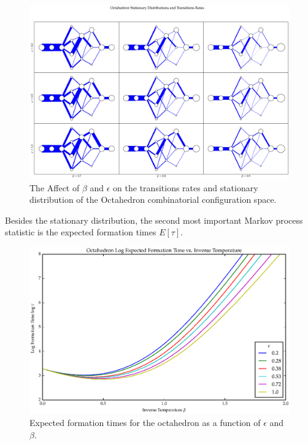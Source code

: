 \begin{figure}[ht]
\label{fig:OctaPiGrid}
\centering
  \includegraphics[scale=0.22]{images/octahedron_pi_Q_grid.eps}
\caption{The Affect of $\beta$ and $\epsilon$ on the transitions rates and stationary distribution of the Octahedron combinatorial configuration space.}
\end{figure}

Besides the stationary distribution, the second most important Markov process statistic is the expected formation times $E[\tau]$.
\begin{figure}[ht]
\label{fig:OctaTau}
\centering
  \includegraphics[scale=0.6]{images/octahedron_tau.eps}
\caption{Expected formation times for the octahedron as a function of $\epsilon$ and $\beta$.}
\end{figure}


